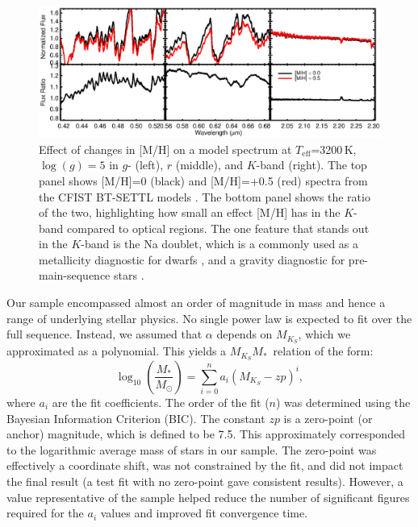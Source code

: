 \documentclass[twocolumn]{aastex62}
\newcommand\teff{\ensuremath{T_\text{eff}}}
\newcommand{\mks}{$M_{K_S}$}
\newcommand{\mmk}{$M_{K_S}$\textendash$M_*$}
\begin{document}
\begin{figure}[htb]
\begin{center}
\includegraphics[width=\textwidth]{metallicity_effect.eps}
\caption{Effect of changes in [M/H] on a model spectrum at \teff=3200\,K, $\log(g)=5$ in $g$- (left), $r$ (middle), and $K$-band (right). The top panel shows [M/H]=0 (black) and [M/H]=+0.5 (red) spectra from the CFIST BT-SETTL models \citep{Allard2012}. The bottom panel shows the ratio of the two, highlighting how small an effect [M/H] has in the $K$-band compared to optical regions. The one feature that stands out in the $K$-band is the Na doublet, which is a commonly used as a metallicity diagnostic for dwarfs \citep{RojasAyala:2010,Terrien:2012lr,Newton:2014}, and a gravity diagnostic for pre-main-sequence stars \citep[e.g.,][]{Schlieder2012}. }
\label{fig:metal}
\end{center}
\end{figure}

Our sample encompassed almost an order of magnitude in mass and hence a range of underlying stellar physics. No single power law is expected to fit over the full sequence. Instead, we assumed that $\alpha$ depends on \mks, which we approximated as a polynomial. This yields a \mmk\ relation of the form:
\begin{equation}\label{eqn:mmk}
\log_{10} \left( \frac{M_*}{M_\odot} \right) = \sum_{i=0}^{n} a_i(M_{K_S}-zp)^i,
\end{equation}
where $a_i$ are the fit coefficients. The order of the fit ($n$) was determined using the Bayesian Information Criterion (BIC). The constant $zp$ is a zero-point (or anchor) magnitude, which is defined to be 7.5. This approximately corresponded to the logarithmic average mass of stars in our sample. The zero-point was effectively a coordinate shift, was not constrained by the fit, and did not impact the final result (a test fit with no zero-point gave consistent results). However, a value representative of the sample helped reduce the number of significant figures required for the $a_i$ values and improved fit convergence time. 
\end{document}

